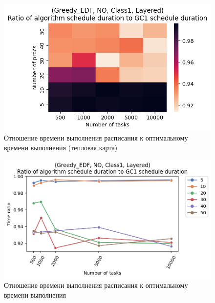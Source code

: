 \begin{figure}[!htbp]
    \centering
    \includegraphics[width=\textwidth]{imgs/layered_class_1/NO_EDF/times.png}
    \caption{Отношение времени выполнения расписания к оптимальному времени выполнения (тепловая карта)}
    \label{fig:NO-layered-EDF-times-heatmap}
\end{figure}

\begin{figure}[!htbp]
    \centering
    \includegraphics[width=\textwidth]{imgs/layered_class_1/NO_EDF/gr_amalgamated.png}
    \caption{Отношение времени выполнения расписания к оптимальному времени выполнения} 
    \label{fig:NO-layered-EDF-times-compiled}
\end{figure}

